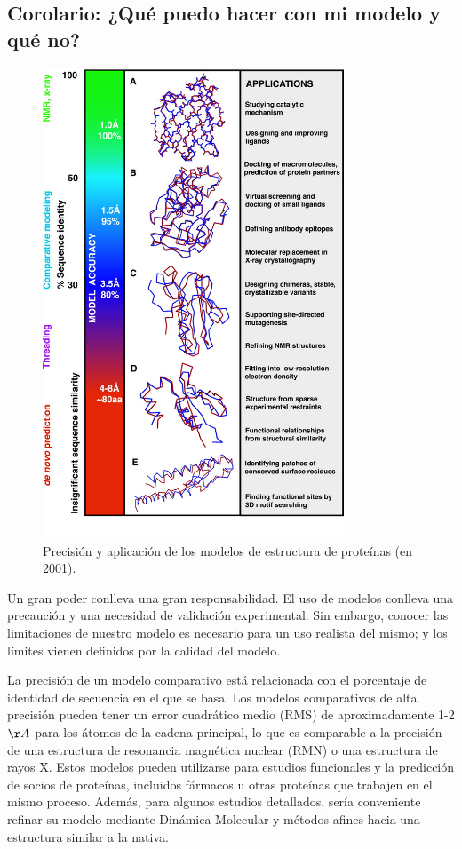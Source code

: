 \subsection{Corolario: ¿Qué puedo hacer con mi modelo y qué no?}
\begin{figure}[h]
\centering
\includegraphics[width = 0.8\textwidth]{figs/sali.jpeg}
\caption{Precisión y aplicación de los modelos de estructura de proteínas (en 2001).}
\end{figure}

Un gran poder conlleva una gran responsabilidad. El uso de modelos conlleva una precaución y una necesidad de validación experimental. Sin embargo, conocer las limitaciones de nuestro modelo es necesario para un uso realista del mismo; y los límites vienen definidos por la calidad del modelo.

La precisión de un modelo comparativo está relacionada con el porcentaje de identidad de secuencia en el que se basa. Los modelos comparativos de alta precisión pueden tener un error cuadrático medio (RMS) de aproximadamente 1-2 $\AA$ para los átomos de la cadena principal, lo que es comparable a la precisión de una estructura de resonancia magnética nuclear (RMN) o una estructura de rayos X. Estos modelos pueden utilizarse para estudios funcionales y la predicción de socios de proteínas, incluidos fármacos u otras proteínas que trabajen en el mismo proceso. Además, para algunos estudios detallados, sería conveniente refinar su modelo mediante Dinámica Molecular y métodos afines hacia una estructura similar a la nativa. 

